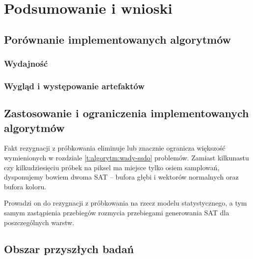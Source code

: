 \chapter{Podsumowanie i wnioski}
\label{t:wnioski}

	\section{Porównanie implementowanych algorytmów}
	\label{t:wnioski:porownanie}
	
		\subsection{Wydajność}
		\label{t:wnioski:porownanie:wydajnosc}
		
		\subsection{Wygląd i występowanie artefaktów}
		\label{t:wnioski:porownanie:wyglad}
	
	\section{Zastosowanie i ograniczenia implementowanych algorytmów}
	\label{t:wnioski:zastosowanie}
	
	
	
	Fakt rezygnacji z próbkowania eliminuje lub znacznie ogranicza większość wymienionych w rozdziale \ref{t:algorytm:wady-ssdo} problemów. Zamiast kilkunastu czy kilkudziesięciu próbek na piksel ma miejsce tylko osiem samplowań, dysponujemy bowiem dwoma SAT -- bufora głębi i wektorów normalnych oraz bufora koloru.
	
	Prowadzi on do rezygnacji z próbkowania na rzecz modelu statystycznego, a tym samym zastąpienia przebiegów rozmycia przebiegami generowania SAT dla poszczególnych warstw.
	
	\section{Obszar przyszłych badań}
	\label{t:wnioski:przyszle}